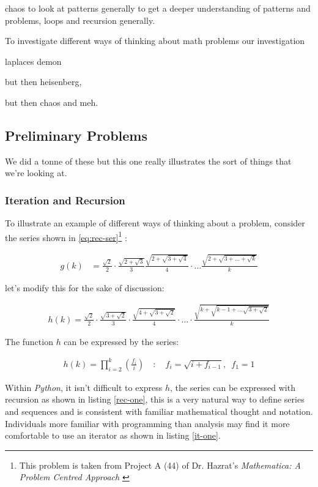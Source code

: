 \documentclass[11pt]{article}
\begin{document}
chaos to look at patterns generally to get a deeper understanding of patterns
and problems, loops and recursion generally.

To investigate different ways of thinking about math problems our investigation

laplaces demon

but then heisenberg,

but then chaos and meh.

\subsection{Preliminary Problems}
\label{sec:org4155872}
We did a tonne of these but this one really illustrates the sort of things that we're looking at.
\subsubsection{Iteration and Recursion}
\label{series-and-recursion}
To illustrate an example of different ways of thinking about a problem, consider the series shown in \eqref{eq:rec-ser}\footnote{This problem is taken from Project A (44) of Dr. Hazrat's \emph{Mathematica: A Problem Centred Approach} \cite{hazratMathematicaProblemCenteredApproach2015}} :

\begin{align}
    g\left( k \right) &=  \frac{\sqrt{2} }{2} \cdot   \frac{\sqrt{2+  \sqrt{3}}  }{3} \frac{\sqrt{2 +  \sqrt{3 +  \sqrt{4} } } }{4} \cdot  \ldots \frac{\sqrt{2 +  \sqrt{3 +  \ldots +  \sqrt{k} } } }{k} \label{eq:rec-ser}
\end{align}

let's modify this for the sake of discussion:

\begin{align}
h\left( k \right) = \frac{\sqrt{2}  }{2} \cdot  \frac{\sqrt{3 +  \sqrt{2} } }{3} \cdot  \frac{\sqrt{4 +  \sqrt{3 +  \sqrt{2} } } }{4} \cdot  \ldots \cdot  \frac{\sqrt{k +  \sqrt{k - 1 +  \ldots \sqrt{3 + \sqrt{2}  } } } }{k} \label{eq:rec-ser-mod}
\end{align}

The function \(h\) can be expressed by the series:

$$\begin{aligned}
h\left( k \right) = \prod^k_{i = 2} \left( \frac{f_i}{i}  \right)  \quad : \quad f_i = \sqrt{i +  f_{i - 1}}, \enspace f_{1} = 1
\end{aligned}$$

Within \emph{Python}, it isn't difficult to express \(h\), the series can be expressed with recursion as shown in listing \ref{rec-one}, this is a very natural way to define series and sequences and is consistent with familiar mathematical thought and notation. Individuals more familiar with programming than analysis may find it more comfortable to use an iterator as shown in listing \ref{it-one}.
\end{document}
